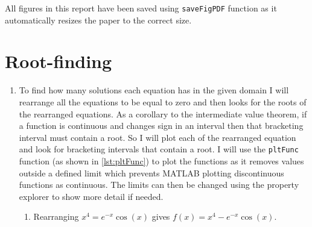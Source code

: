 \documentclass[a4paper,11pt]{article}
\begin{document}

\tableofcontents

\hfill \break

All figures in this report have been saved using \verb*|saveFigPDF| function 
as it automatically resizes the paper to the correct size.


\section{Root-finding}
\begin{enumerate}
	\item To find how many solutions each equation has in the given domain I 
	will rearrange all the equations to be equal to zero and then looks for 
	the roots of the rearranged equations. As a corollary to the intermediate 
	value theorem, if a function is continuous and changes sign in an 
	interval 
	then that bracketing interval must contain a root. So I will plot each of 
	the 
	rearranged equation and look for bracketing intervals that contain a 
	root. I will use the 
	\verb*|pltFunc| function (as shown in \autoref{lst:pltFunc}) to plot the 
	functions as it removes values 
	outside a defined limit which prevents MATLAB plotting discontinuous 
	functions as continuous. The limits can then be changed using the 
	property explorer to show more detail if needed.
	\begin{enumerate}
		\item Rearranging $x^{4} = e^{-x} \cos(x)$ gives $f(x) = x^{4} - 
		e^{-x} \cos(x)$.
		
\end{enumerate}
\end{enumerate}
\end{document}
